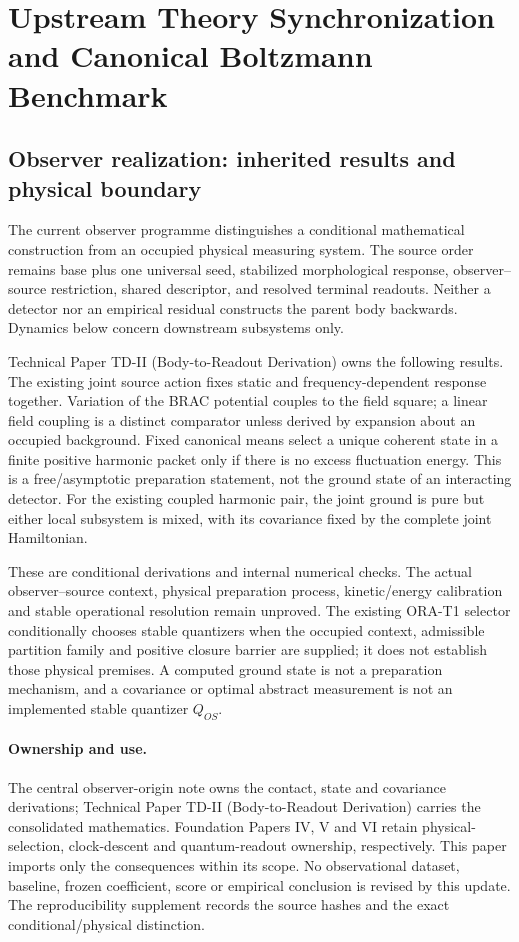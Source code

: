 \documentclass[11pt]{article}
\begin{document}
\section{Upstream Theory Synchronization and Canonical Boltzmann Benchmark}
\label{sec:upstream-sync}

\subsection{Observer realization: inherited results and physical boundary}
\label{sec:observer-update-20260914}
The current observer programme distinguishes a conditional mathematical
construction from an occupied physical measuring system. The source order
remains base plus one universal seed, stabilized morphological response,
observer--source restriction, shared descriptor, and resolved terminal
readouts. Neither a detector nor an empirical residual constructs the parent
body backwards. Dynamics below concern downstream subsystems only.

Technical Paper TD-II (Body-to-Readout Derivation) owns the following
results. The existing joint source action fixes static and frequency-dependent
response together. Variation of the BRAC potential couples to the field
square; a linear field coupling is a distinct comparator unless derived by
expansion about an occupied background. Fixed canonical means select a unique
coherent state in a finite positive harmonic packet only if there is no excess
fluctuation energy. This is a free/asymptotic preparation statement, not the
ground state of an interacting detector. For the existing coupled harmonic
pair, the joint ground is pure but either local subsystem is mixed, with its
covariance fixed by the complete joint Hamiltonian.

These are conditional derivations and internal numerical checks. The actual
observer--source context, physical preparation process, kinetic/energy
calibration and stable operational resolution remain unproved. The existing
ORA-T1 selector conditionally chooses stable quantizers when the occupied
context, admissible partition family and positive closure barrier are supplied;
it does not establish those physical premises. A computed ground state is not
a preparation mechanism, and a covariance or optimal abstract measurement is
not an implemented stable quantizer $Q_{OS}$.

\paragraph{Ownership and use.}
The central observer-origin note owns the contact, state and covariance
derivations; Technical Paper TD-II (Body-to-Readout Derivation) carries the consolidated
mathematics. Foundation Papers IV, V and VI retain physical-selection,
clock-descent and quantum-readout ownership, respectively. This paper imports
only the consequences within its scope. No observational dataset, baseline,
frozen coefficient, score or empirical conclusion is revised by this update.
The reproducibility supplement records the source hashes and the exact
conditional/physical distinction.
\end{document}
